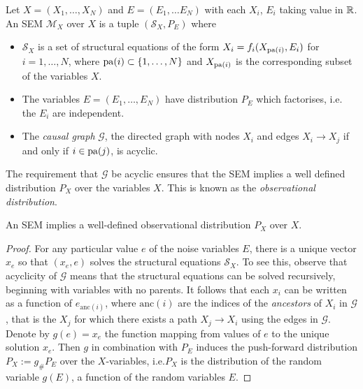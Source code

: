 \begin{definition}\label{def:causality-classical-sem}
Let $X = (X_1, \ldots, X_N)$ and $E = (E_1, \ldots E_N)$ with each $X_i$, $E_i$ taking value in $\mathbb{R}$. An SEM $\mathcal{M}_X$ over $X$ is a tuple $(\mathcal{S}_X, P_E)$ where
\begin{itemize}
	\item $\mathcal{S}_X$ is a set of structural equations of the form $X_i = f_i(X_{\operatorname{pa}(i)}, E_i)$ for $i=1,\ldots,N$, where 
$\operatorname{pa}(i) \subset \{1,\ldots,N\}$ and $X_{\operatorname{pa}(i)}$ is the corresponding subset of the variables $X$.
	\item The variables $E = (E_1,\ldots,E_N)$ have distribution $P_E$ which factorises, i.e. the $E_i$ are independent.
	\item The \emph{causal graph} $\mathcal{G}$, the directed graph with nodes $X_i$ and edges $X_i \to X_j$ if and only if $i \in \operatorname{pa}(j)$, is acyclic.
\end{itemize}
\end{definition}

The requirement that $\mathcal{G}$ be acyclic ensures that the SEM implies a well defined distribution $P_X$ over the variables $X$. This is known as the \emph{observational distribution}.

\medskip

\begin{lemma}\label{lemma:acyclic-sem-well-defined-obs-dist}
An SEM implies a well-defined observational distribution $P_X$ over $X$.
\end{lemma}

\begin{proof}
For any particular value $e$ of the noise variables $E$, there is a unique vector $x_e$ so that $(x_e, e)$ solves the structural equations $\mathcal{S}_X$. To see this, observe that acyclicity of $\mathcal{G}$ means that the structural equations can be solved recursively, beginning with variables with no parents. It follows that each $x_i$ can be written as a function of $e_{\text{anc}(i)}$, where $\text{anc}(i)$ are the indices of the \emph{ancestors} of $X_i$ in $\mathcal{G}$, that is the $X_j$ for which there exists a path $X_j \to X_i$ using the edges in $\mathcal{G}$. 
Denote by $g(e) = x_e$ the function mapping from values of $e$ to the unique solution $x_e$.
Then $g$ in combination with $P_E$ induces the push-forward distribution $P_X := g_\# P_E$ over the $X$-variables, i.e.\:$P_X$ is the distribution of the random variable $g(E)$, a function of the random variables $E$.
\end{proof}

